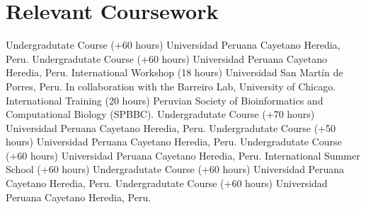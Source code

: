 \documentclass[11pt,a4paper,sans]{moderncv}
\begin{document}
\section{Relevant Coursework}
  {{\footnotesize Undergradutate Course (+60 hours)}}
  {{\footnotesize Universidad Peruana Cayetano Heredia, Peru.}}
  {}
  {}
  {{\footnotesize Undergradutate Course (+60 hours)}}
  {{\footnotesize Universidad Peruana Cayetano Heredia, Peru.}}
  {}
  {}
  {{\footnotesize International Workshop (18 hours)}}
  {{\footnotesize Universidad San Martín de Porres, Peru.}}
  {{\footnotesize In collaboration with the Barreiro Lab, University of Chicago.}}
  {}
  {}
  {{\footnotesize International Training (20 hours)}}
  {{\footnotesize Peruvian Society of Bioinformatics and Computational Biology (SPBBC).}}
  {}
  {}  
  {{\footnotesize Undergradutate Course (+70 hours)}}
  {{\footnotesize Universidad Peruana Cayetano Heredia, Peru.}}
  {}
  {}
  {{\footnotesize Undergradutate Course (+50 hours)}}
  {{\footnotesize Universidad Peruana Cayetano Heredia, Peru.}}
  {}
  {}
  {{\footnotesize Undergradutate Course (+60 hours)}}
  {{\footnotesize Universidad Peruana Cayetano Heredia, Peru.}}
  {}
  {}
  {{\footnotesize International Summer School (+60 hours)}}
  {}
  {}
  {}
  {{\footnotesize Undergradutate Course (+60 hours)}}
  {{\footnotesize Universidad Peruana Cayetano Heredia, Peru.}}
  {}
  {}
  {{\footnotesize Undergradutate Course (+60 hours)}}
  {{\footnotesize Universidad Peruana Cayetano Heredia, Peru.}}
  {}
  {}
\end{document}
